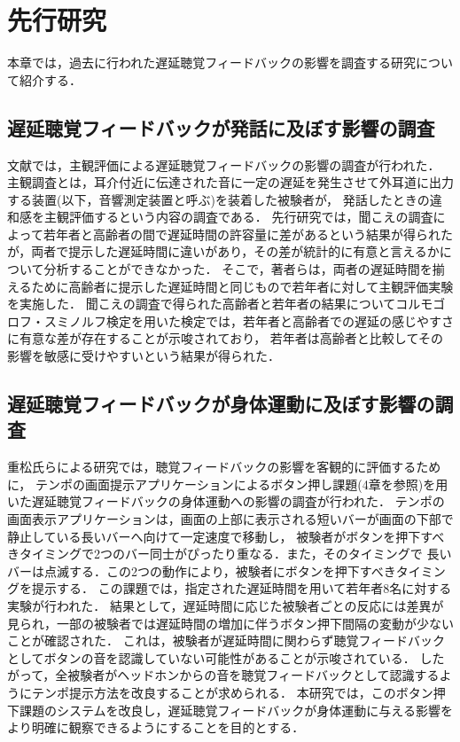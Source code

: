 \chapter{先行研究}
本章では，過去に行われた遅延聴覚フィードバックの影響を調査する研究について紹介する．
\section{遅延聴覚フィードバックが発話に及ぼす影響の調査}
文献\cite{kayama}では，主観評価による遅延聴覚フィードバックの影響の調査が行われた．
主観調査とは，耳介付近に伝達された音に一定の遅延を発生させて外耳道に出力する装置(以下，音響測定装置と呼ぶ)を装着した被験者が，
発話したときの違和感を主観評価するという内容の調査である．
先行研究\cite{kayama}では，聞こえの調査によって若年者と高齢者の間で遅延時間の許容量に差があるという結果が得られたが，両者で提示した遅延時間に違いがあり，その差が統計的に有意と言えるかについて分析することができなかった．
そこで，著者らは，両者の遅延時間を揃えるために高齢者に提示した遅延時間と同じもので若年者に対して主観評価実験を実施した．
聞こえの調査で得られた高齢者と若年者の結果についてコルモゴロフ・スミノルフ検定を用いた検定では，若年者と高齢者での遅延の感じやすさに有意な差が存在することが示唆されており，
若年者は高齢者と比較してその影響を敏感に受けやすいという結果が得られた．
\section{遅延聴覚フィードバックが身体運動に及ぼす影響の調査}
重松氏らによる研究\cite{shigematu}では，聴覚フィードバックの影響を客観的に評価するために，
テンポの画面提示アプリケーション\cite{Syuuronn-shigematu}によるボタン押し課題(4章を参照)を用いた遅延聴覚フィードバックの身体運動への影響の調査が行われた．
テンポの画面表示アプリケーションは，画面の上部に表示される短いバーが画面の下部で静止している長いバーへ向けて一定速度で移動し，
被験者がボタンを押下すべきタイミングで2つのバー同士がぴったり重なる．また，そのタイミングで
長いバーは点滅する．この2つの動作により，被験者にボタンを押下すべきタイミングを提示する．
この課題では，指定された遅延時間を用いて若年者8名に対する実験が行われた．
結果として，遅延時間に応じた被験者ごとの反応には差異が見られ，一部の被験者では遅延時間の増加に伴うボタン押下間隔の変動が少ないことが確認された．
これは，被験者が遅延時間に関わらず聴覚フィードバックとしてボタンの音を認識していない可能性があることが示唆されている．
したがって，全被験者がヘッドホンからの音を聴覚フィードバックとして認識するようにテンポ提示方法を改良することが求められる．
本研究では，このボタン押下課題のシステムを改良し，遅延聴覚フィードバックが身体運動に与える影響をより明確に観察できるようにすることを目的とする．
